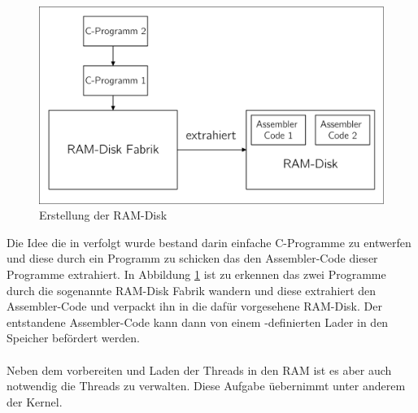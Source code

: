 \newpage
\begin{figure}[h!]
	\centering
	\includegraphics[scale=0.60]{common/draft-thread-ramdisk.pdf}	
	\caption{Erstellung der RAM-Disk}
	\label{draft:draft-thread-ramdisk}
\end{figure}
\noindent
Die Idee die in \mops verfolgt wurde bestand darin einfache C-Programme zu entwerfen und diese durch ein Programm zu schicken das den Assembler-Code dieser Programme extrahiert. In Abbildung \ref{draft:draft-thread-ramdisk} ist zu erkennen das zwei Programme durch die sogenannte RAM-Disk Fabrik wandern und diese extrahiert den Assembler-Code und verpackt ihn in die daf\"ur vorgesehene RAM-Disk. Der entstandene Assembler-Code kann dann von einem \mops -definierten Lader in den Speicher bef\"ordert werden.\\\\
Neben dem vorbereiten und Laden der Threads in den RAM ist es aber auch notwendig die Threads zu verwalten. Diese Aufgabe \"uebernimmt unter anderem der Kernel.
